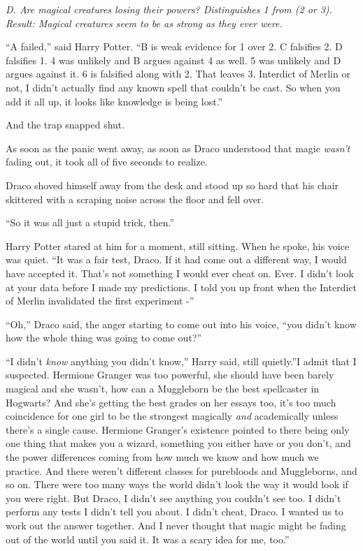 \emph{D. Are magical creatures losing their powers? Distinguishes 1 from
(2 or 3). Result: Magical creatures seem to be as strong as they ever
were.}

``A failed,'' said Harry Potter. ``B is weak evidence for 1 over 2. C
falsifies 2. D falsifies 1. 4 was unlikely and B argues against 4 as
well. 5 was unlikely and D argues against it. 6 is falsified along with
2. That leaves 3. Interdict of Merlin or not, I didn't actually find any
known spell that couldn't be cast. So when you add it all up, it looks
like knowledge is being lost.''

And the trap snapped shut.

As soon as the panic went away, as soon as Draco understood that magic
\emph{wasn't} fading out, it took all of five seconds to realize.

Draco shoved himself away from the desk and stood up so hard that his
chair skittered with a scraping noise across the floor and fell over.

``So it was all just a stupid trick, then.''

Harry Potter stared at him for a moment, still sitting. When he spoke,
his voice was quiet. ``It was a fair test, Draco. If it had come out a
different way, I would have accepted it. That's not something I would
ever cheat on. Ever. I didn't look at your data before I made my
predictions. I told you up front when the Interdict of Merlin
invalidated the first experiment -''

``Oh,'' Draco said, the anger starting to come out into his voice, ``you
didn't know how the whole thing was going to come out?''

``I didn't \emph{know} anything you didn't know,'' Harry said, still
quietly.''I admit that I suspected. Hermione Granger was too powerful,
she should have been barely magical and she wasn't, how can a Muggleborn
be the best spellcaster in Hogwarts? And she's getting the best grades
on her essays too, it's too much coincidence for one girl to be the
strongest magically \emph{and} academically unless there's a single
cause. Hermione Granger's existence pointed to there being only one
thing that makes you a wizard, something you either have or you don't,
and the power differences coming from how much we know and how much we
practice. And there weren't different classes for purebloods and
Muggleborns, and so on. There were too many ways the world didn't look
the way it would look if you were right. But Draco, I didn't see
anything you couldn't see too. I didn't perform any tests I didn't tell
you about. I didn't cheat, Draco. I wanted us to work out the answer
together. And I never thought that magic might be fading out of the
world until you said it. It was a scary idea for me, too.''


